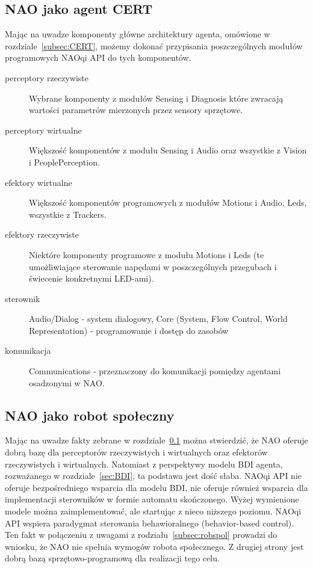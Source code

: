 \subsection{NAO jako agent CERT}
\label{subsec:NAOCERT}
Mając na uwadze komponenty główne architektury agenta, omówione w rozdziale~\ref{subsec:CERT}, możemy dokonać przypisania poszczególnych modułów programowych NAOqi API do tych komponentów. 
\begin{description}
\item[perceptory rzeczywiste] Wybrane komponenty z modułów Sensing i Diagnosis które zwracają wartości parametrów mierzonych przez sensory sprzętowe.
\item[perceptory wirtualne] Większość komponentów z modułu Sensing i Audio oraz wszystkie z Vision i PeoplePerception.
\item[efektory wirtualne] Większość komponentów programowych z modułów Motions i Audio, Leds, wszystkie z Trackers.
\item[efektory rzeczywiste] Niektóre komponenty programowe z modułu Motions i Leds (te umożliwiające sterowanie napędami w poszczególnych przegubach i świecenie konkretnymi LED-ami).
\item[sterownik] Audio/Dialog - system dialogowy, Core (System, Flow Control, World Representation) - programowanie i dostęp do zasobów
\item[komunikacja] Communications - przeznaczony do komunikacji pomiędzy agentami osadzonymi w NAO.
\end{description}


\subsection{NAO jako robot społeczny}
Mając na uwadze fakty zebrane w rozdziale~\ref{subsec:NAOCERT} można stwierdzić, że NAO oferuje dobrą bazę dla perceptorów rzeczywistych i wirtualnych oraz efektorów rzeczywistych i wirtualnych. Natomiast z perspektywy modelu BDI agenta, rozważanego w rozdziale~\ref{sec:BDI}, ta podstawa jest dość słaba. NAOqi API nie oferuje bezpośredniego wsparcia dla modelu BDI, nie oferuje również wsparcia dla implementacji sterowników w formie automatu skończonego. Wyżej wymienione modele można zaimplementować, ale startując z nieco niższego poziomu. NAOqi API wspiera paradygmat sterowania behawioralnego (behavior-based control). Ten fakt w połączeniu z uwagami z rodziału~\ref{subsec:robspol} prowadzi do wniosku, że NAO nie spełnia wymogów robota społecznego. Z drugiej strony jest dobrą bazą sprzętowo-programową dla realizacji tego celu.

